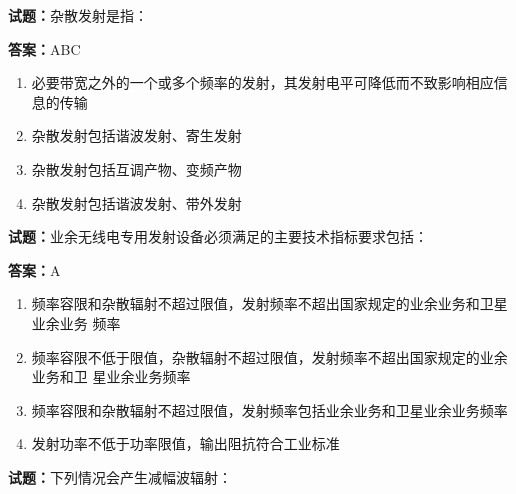 \documentclass{ctexbook}
\begin{document}




\vspace{1em}

\textbf{试题：}杂散发射是指： 

\textbf{答案：}ABC 


\begin{enumerate}[leftmargin=3em]
  \item 必要带宽之外的一个或多个频率的发射，其发射电平可降低而不致影响相应信息的传输 

  \item 杂散发射包括谐波发射、寄生发射 

  \item 杂散发射包括互调产物、变频产物 

  \item 杂散发射包括谐波发射、带外发射 

\end{enumerate}





\vspace{1em}

\textbf{试题：}业余无线电专用发射设备必须满足的主要技术指标要求包括： 

\textbf{答案：}A 

\begin{enumerate}[leftmargin=3em]
  \item 频率容限和杂散辐射不超过限值，发射频率不超出国家规定的业余业务和卫星业余业务
频率 

  \item 频率容限不低于限值，杂散辐射不超过限值，发射频率不超出国家规定的业余业务和卫
星业余业务频率 

  \item 频率容限和杂散辐射不超过限值，发射频率包括业余业务和卫星业余业务频率 

  \item 发射功率不低于功率限值，输出阻抗符合工业标准 

\end{enumerate}





\vspace{1em}

\textbf{试题：}下列情况会产生减幅波辐射： 
\end{document}
